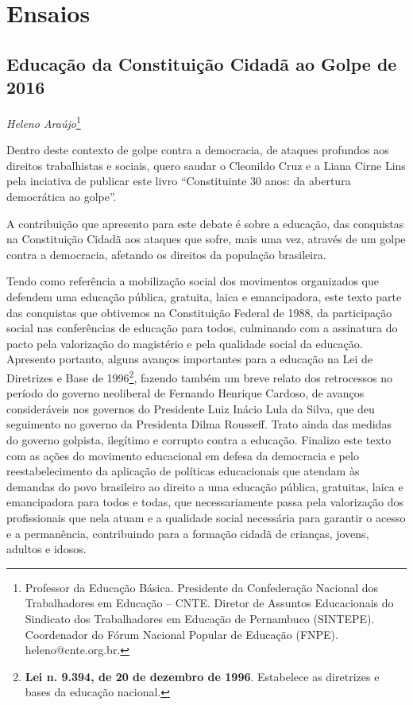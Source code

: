 \part{Ensaios}

\chapter{Educação da Constituição Cidadã ao Golpe de 2016}

\begin{flushright}
\emph{Heleno Araújo}\footnote{Professor da Educação Básica. Presidente da
  Confederação Nacional dos Trabalhadores em Educação -- CNTE. Diretor
  de Assuntos Educacionais do Sindicato dos Trabalhadores em Educação de
  Pernambuco (SINTEPE). Coordenador do Fórum Nacional Popular de
  Educação (FNPE). heleno@cnte.org.br.}
\end{flushright}

Dentro deste contexto de golpe contra a democracia, de ataques profundos
aos direitos trabalhistas e sociais, quero saudar o Cleonildo Cruz e a
Liana Cirne Lins pela inciativa de publicar este livro ``Constituinte 30
anos: da abertura democrática ao golpe''.

A contribuição que apresento para este debate é sobre a educação, das
conquistas na Constituição Cidadã aos ataques que sofre, mais uma vez,
através de um golpe contra a democracia, afetando os direitos da
população brasileira.

Tendo como referência a mobilização social dos movimentos organizados
que defendem uma educação pública, gratuita, laica e emancipadora, este
texto parte das conquistas que obtivemos na Constituição Federal de
1988, da participação social nas conferências de educação para todos,
culminando com a assinatura do pacto pela valorização do magistério e
pela qualidade social da educação. Apresento portanto, alguns avanços
importantes para a educação na Lei de Diretrizes e Base de
1996\footnote{\textbf{Lei n. 9.394, de 20 de dezembro de 1996}.
  Estabelece as diretrizes e bases da educação nacional.}, fazendo
também um breve relato dos retrocessos no período do governo neoliberal
de Fernando Henrique Cardoso, de avanços consideráveis nos governos do
Presidente Luiz Inácio Lula da Silva, que deu seguimento no governo da
Presidenta Dilma Rousseff. Trato ainda das medidas do governo golpista,
ilegítimo e corrupto contra a educação. Finalizo este texto com as ações
do movimento educacional em defesa da democracia e pelo
reestabelecimento da aplicação de políticas educacionais que atendam às
demandas do povo brasileiro ao direito a uma educação pública,
gratuitas, laica e emancipadora para todos e todas, que necessariamente
passa pela valorização dos profissionais que nela atuam e a qualidade
social necessária para garantir o acesso e a permanência, contribuindo
para a formação cidadã de crianças, jovens, adultos e idosos.


